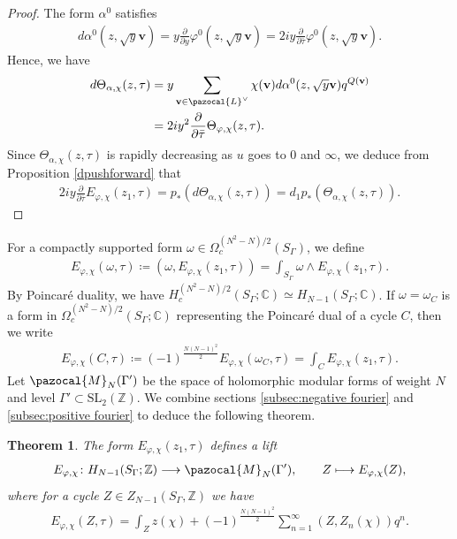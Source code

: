 \documentclass[a4paper,11pt]{amsart} %
\newcommand{\8}{\infty}
\newcommand{\Z}{\mathbb{Z}}
\newcommand{\vbf}{\mathbf{v}}
\newcommand{\SL}{\mathrm{SL}}
\newcommand{\C}{\mathbb{C}}
\newcommand{\Lcal}{\pazocal{L}}
\newcommand{\Mcal}{\pazocal{M}}
\theoremstyle{mytheoremstyle}
\newtheorem{thm}{Theorem}[section]
\theoremstyle{remark}
\numberwithin{equation}{section}
\begin{document}
\begin{proof} The form $\alpha^0$ satisfies
\begin{align}
d\alpha^0(z,\sqrt{y}\vbf)=y\frac{\partial}{\partial y}\varphi^0(z,\sqrt{y}\vbf)=2iy \frac{\partial}{\partial \bar{\tau}}\varphi^0(z,\sqrt{y}\vbf). 
\end{align}
Hence, we have
\begin{align}
d\Theta_{\alpha, \chi}(z,\tau)
& = y\sum_{\vbf \in \Lcal^\vee} \chi(\vbf)d\alpha^0(z,\sqrt{y}\vbf)q^{Q(\vbf)} \nonumber \\
& = 2iy^2 \frac{\partial}{\partial \bar{\tau}} \Theta_{\varphi, \chi}(z,\tau).
\end{align}
Since $\Theta_{\alpha, \chi}(z,\tau)$ is rapidly decreasing as $u$ goes to $0$ and $\8$, we deduce from Proposition \ref{dpushforward} that
\begin{align}
2iy\frac{\partial}{\partial \overline{\tau}} E_{\varphi, \chi}(z_1,\tau)=p_\ast \left (d \Theta_{\alpha, \chi}(z,\tau)\right )=d_1 p_\ast \left (\Theta_{\alpha, \chi}(z,\tau)\right ).
\end{align}
\end{proof}

For a compactly supported form $\omega \in \Omega_c^{(N^2-N)/2}(S_\Gamma)$, we define
\begin{align} \label{pairing theta lift}
E_{\varphi, \chi}(\omega,\tau) \coloneqq  \left ( \omega, E_{\varphi, \chi}(z_1,\tau) \right ) = \int_{S_\Gamma} \omega \wedge E_{\varphi, \chi}(z_1,\tau) .
\end{align}
By Poincaré duality, we have $H_c^{(N^2-N)/2}(S_\Gamma;\C) \simeq H_{N-1}(S_\Gamma;\C)$. If $\omega=\omega_C$ is a form in $ \Omega_c^{(N^2-N)/2}(S_\Gamma;\C)$ representing the Poincaré dual of a cycle $C$, then we write
\begin{align}
E_{\varphi, \chi}(C,\tau) \coloneqq  (-1)^{\frac{N(N-1)^2}{2}} E_{\varphi, \chi}(\omega_C,\tau)= \int_{C} E_{\varphi, \chi}(z_1,\tau).
\end{align}
Let $\Mcal_N(\Gamma')$ be the space of holomorphic modular forms of weight $N$ and level $\Gamma' \subset \SL_2(\Z)$. We combine sections  \ref{subsec:negative fourier} and  \ref{subsec:positive fourier} to deduce the following theorem.
\begin{thm} The form $E_{\varphi, \chi}(z_1,\tau)$ defines a lift
\begin{align}
E_{\varphi, \chi} \colon H_{N-1}(S_\Gamma;\Z) \longrightarrow \Mcal_N(\Gamma'), \qquad
Z \longmapsto E_{\varphi, \chi}(Z),
\end{align}
where for a cycle $Z \in Z_{N-1}(S_\Gamma, \Z)$ we have 
\begin{align}
E_{\varphi, \chi}(Z,\tau)=\int_Z z(\chi)+ (-1)^{\frac{N(N-1)^2}{2}}\sum_{n=1}^\8\left ( Z,Z_n(\chi) \right ) q^n. 
\end{align}
\end{thm}
 
\end{document}
